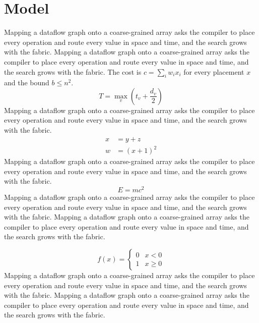 \documentclass[twocolumn]{article}
\begin{document}
\section{Model}
Mapping a dataflow graph onto a coarse-grained array asks the compiler to place every operation and route every value in space and time, and the search grows with the fabric. Mapping a dataflow graph onto a coarse-grained array asks the compiler to place every operation and route every value in space and time, and the search grows with the fabric. The cost is $c = \sum_i w_i x_i$ for every placement $x$ and the bound $b \le n^2$.
\begin{equation}\label{eq:a}
  T = \max_{v} \left( t_v + \frac{d_v}{2} \right)
\end{equation}
Mapping a dataflow graph onto a coarse-grained array asks the compiler to place every operation and route every value in space and time, and the search grows with the fabric.
\begin{align}
  x &= y + z \label{eq:b}\\
  w &= \left( x + 1 \right)^2 \nonumber
\end{align}
Mapping a dataflow graph onto a coarse-grained array asks the compiler to place every operation and route every value in space and time, and the search grows with the fabric.
\[ E = mc^2 \]
Mapping a dataflow graph onto a coarse-grained array asks the compiler to place every operation and route every value in space and time, and the search grows with the fabric. Mapping a dataflow graph onto a coarse-grained array asks the compiler to place every operation and route every value in space and time, and the search grows with the fabric.

\begin{equation*}
  f(x) = \begin{cases} 0 & x < 0 \\ 1 & x \ge 0 \end{cases}
\end{equation*}
Mapping a dataflow graph onto a coarse-grained array asks the compiler to place every operation and route every value in space and time, and the search grows with the fabric. Mapping a dataflow graph onto a coarse-grained array asks the compiler to place every operation and route every value in space and time, and the search grows with the fabric.
\end{document}

